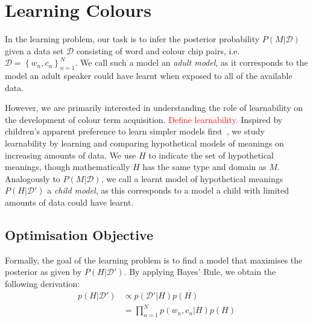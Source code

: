 \documentclass[11pt]{article}
\begin{document}
\section{Learning Colours}
\label{ssec:learning}

In the learning problem, our task is to infer the posterior probability $P(M|\mathcal{D})$ given a data set $\mathcal{D}$ consisting of word and colour chip pairs, i.e. $\mathcal{D}=\left\{w_n, c_n\right\}_{n=1}^{N}$. %
We call such a model an \textit{adult model}, as it corresponds to the model an adult speaker could have learnt when exposed to all of the available data. %

However, we are primarily interested in understanding the role of learnability on the development of colour term acquisition. 
\textcolor{red}{Define learnability.} 
Inspired by children's apparent preference to learn simpler models first~\cite{tenenbaum2020hacker}, we study learnability by learning and comparing hypothetical models of meanings on increasing amounts of data. 
We use $H$ to indicate the set of hypothetical meanings, though mathematically $H$ has the same type and domain as $M$. 
Analogously to $P(M|\mathcal{D})$, we call a learnt model of hypothetical meanings $P(H|\mathcal{D}')$ a \textit{child model}, as this corresponds to a model a child with limited amounts of data could have learnt.



\subsection{Optimisation Objective}
\label{sssec:learn_optim}

Formally, the goal of the learning problem is to find a model that maximises the posterior as given by $P(H|\mathcal{D'})$. 
By applying Bayes' Rule, we obtain the following derivation:
\begin{equation}
    \label{eq:learning_objective_pH_D}
    \begin{split}
        p(H|\mathcal{D'})
        & \propto p(\mathcal{D'}|H)p(H) \\
        & = \prod_{n=1}^{N} p(w_n, c_n|H)p(H)
    \end{split}
\end{equation}
\end{document}

